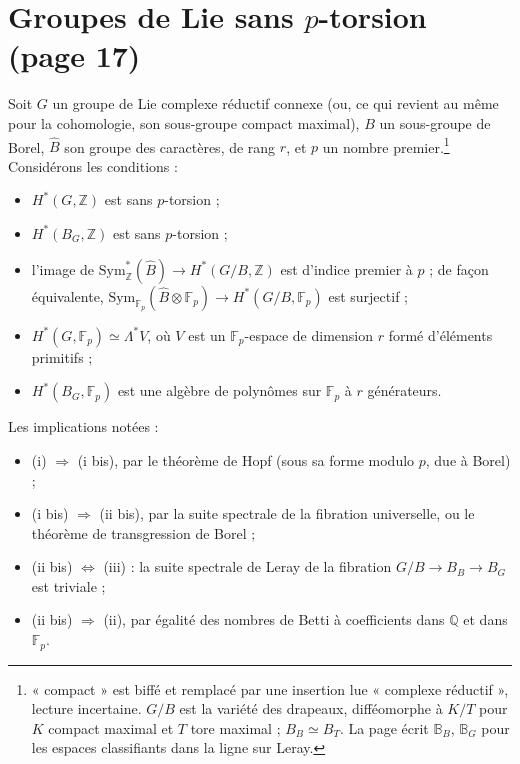 \documentclass[11pt,a4paper]{article}
\begin{document}
\section*{Groupes de Lie sans $p$-torsion (page 17)}

Soit $G$ un groupe de Lie complexe réductif connexe (ou, ce qui revient au
même pour la cohomologie, son sous-groupe compact maximal), $B$ un
sous-groupe de Borel, $\hat{B}$ son groupe des caractères, de rang $r$, et
$p$ un nombre premier.\footnote{« compact » est biffé et remplacé par une
insertion lue « complexe réductif », lecture incertaine. $G/B$ est la variété
des drapeaux, difféomorphe à $K/T$ pour $K$ compact maximal et $T$ tore
maximal ; $B_{B} \simeq B_{T}$. La page écrit $\mathbb{B}_{B}$,
$\mathbb{B}_{G}$ pour les espaces classifiants dans la ligne sur Leray.}
Considérons les conditions :

\begin{itemize}
\item[(i)] $H^{*}(G,\mathbb{Z})$ est sans $p$-torsion ;
\item[(ii)] $H^{*}(B_{G},\mathbb{Z})$ est sans $p$-torsion ;
\item[(iii)] l'image de $\mathrm{Sym}_{\mathbb{Z}}^{*}(\hat{B}) \to
H^{*}(G/B,\mathbb{Z})$ est d'indice premier à $p$ ; de façon équivalente,
$\mathrm{Sym}_{\mathbb{F}_{p}}(\hat{B} \otimes \mathbb{F}_{p}) \to
H^{*}(G/B,\mathbb{F}_{p})$ est surjectif ;
\item[(i bis)] $H^{*}(G,\mathbb{F}_{p}) \simeq \Lambda^{*}V$, où $V$ est un
$\mathbb{F}_{p}$-espace de dimension $r$ formé d'éléments primitifs ;
\item[(ii bis)] $H^{*}(B_{G},\mathbb{F}_{p})$ est une algèbre de polynômes
sur $\mathbb{F}_{p}$ à $r$ générateurs.
\end{itemize}

Les implications notées :
\begin{itemize}
\item[--] (i) $\Rightarrow$ (i bis), par le théorème de Hopf (sous sa forme
modulo $p$, due à Borel) ;
\item[--] (i bis) $\Rightarrow$ (ii bis), par la suite spectrale de la
fibration universelle, ou le théorème de transgression de Borel ;
\item[--] (ii bis) $\Leftrightarrow$ (iii) : la suite spectrale de Leray de
la fibration $G/B \to B_{B} \to B_{G}$ est triviale ;
\item[--] (ii bis) $\Rightarrow$ (ii), par égalité des nombres de Betti à
coefficients dans $\mathbb{Q}$ et dans $\mathbb{F}_{p}$.
\end{itemize}
\end{document}
